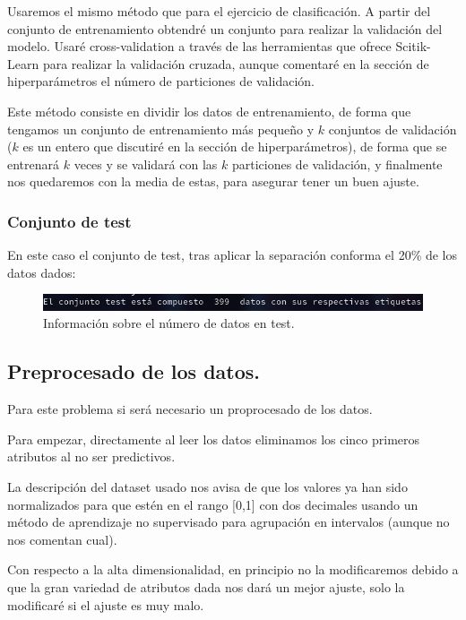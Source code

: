 \documentclass[12pt, spanish]{article}
\begin{document}
Usaremos el mismo método que para el ejercicio de clasificación. A partir del conjunto de entrenamiento obtendré un conjunto para realizar la validación del modelo. Usaré cross-validation a través de las herramientas que ofrece Scitik-Learn para realizar la validación cruzada\cite{crossval}, aunque comentaré en la sección de hiperparámetros el número de particiones de validación. 

Este método consiste en dividir los datos de entrenamiento, de forma que tengamos un conjunto de entrenamiento más pequeño y $k$ conjuntos de validación ($k$ es un entero que discutiré en la sección de hiperparámetros), de forma que se entrenará $k$  veces y se validará con las $k$ particiones de validación, y finalmente nos quedaremos con la media de estas, para asegurar tener un buen ajuste.

\subsubsection{Conjunto de test}

En este caso el conjunto de test, tras aplicar la separación conforma el 20\% de los datos dados:

\begin{figure}[H]
	\centering
	\includegraphics[scale=0.6]{regresion/num_datos_test.png}
	\caption{Información sobre el número de datos  en test.}
	\label{datosRegTest}
\end{figure}


\newpage

\subsection{Preprocesado de los datos.}

Para este problema si será necesario un proprocesado de los datos.

Para empezar, directamente al leer los datos eliminamos los cinco primeros atributos al no ser predictivos.

La descripción del dataset usado nos avisa de que los valores ya han sido normalizados para que estén en el rango [0,1] con dos decimales usando un método de aprendizaje no supervisado para agrupación en intervalos (aunque no nos comentan cual).

Con respecto a la alta dimensionalidad, en principio no la modificaremos debido a que la gran variedad de atributos dada nos dará un mejor ajuste, solo la modificaré si el ajuste es muy malo.
\end{document}

